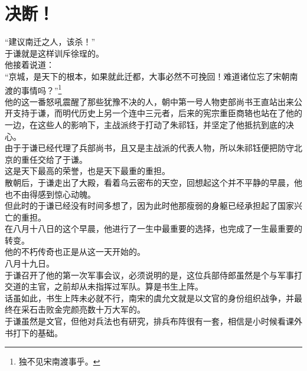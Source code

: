 \section{决断！}
\ifnum{}
	\begin{multicols}{\theparacolNo}
\fi
“建议南迁之人，该杀！”\\

于谦就是这样训斥徐珵的。\\

他接着说道：\\

“京城，是天下的根本，如果就此迁都，大事必然不可挽回！难道诸位忘了宋朝南渡的事情吗？”\footnote{独不见宋南渡事乎。}\\

他的这一番怒吼震醒了那些犹豫不决的人，朝中第一号人物吏部尚书王直站出来公开支持于谦，而明代历史上另一个连中三元者，后来的宪宗重臣商辂也站在了他的一边，在这些人的影响下，主战派终于打动了朱祁钰，并坚定了他抵抗到底的决心。\\

由于于谦已经代理了兵部尚书，且又是主战派的代表人物，所以朱祁钰便把防守北京的重任交给了于谦。\\

这是天下最高的荣誉，也是天下最重的重担。\\

散朝后，于谦走出了大殿，看着乌云密布的天空，回想起这个并不平静的早晨，他也不由得感到惊心动魄。\\

但此时的于谦已经没有时间多想了，因为此时他那瘦弱的身躯已经承担起了国家兴亡的重担。\\

在八月十八日的这个早晨，他进行了一生中最重要的选择，也完成了一生最重要的转变。\\

他的不朽传奇也正是从这一天开始的。\\

八月十九日。\\

于谦召开了他的第一次军事会议，必须说明的是，这位兵部侍郎虽然是个与军事打交道的主官，之前却从未指挥过军队。算是书生上阵。\\

话虽如此，书生上阵未必就不行，南宋的虞允文就是以文官的身份组织战争，并最终在采石击败金完颜亮数十万大军的。\\

于谦虽然是文官，但他对兵法也有研究，排兵布阵很有一套，相信是小时候看课外书打下的基础。\\


\end{multicols}
